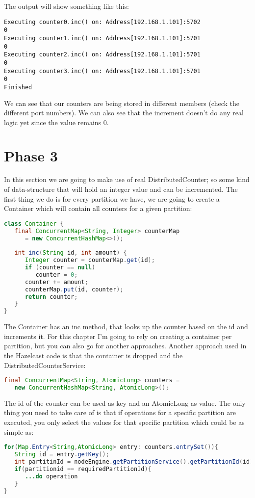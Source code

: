 The output will show something like this:
\begin{lstlisting}
Executing counter0.inc() on: Address[192.168.1.101]:5702
0
Executing counter1.inc() on: Address[192.168.1.101]:5701
0
Executing counter2.inc() on: Address[192.168.1.101]:5701
0
Executing counter3.inc() on: Address[192.168.1.101]:5701
0
Finished
\end{lstlisting}
We can see that our counters are being stored in different members (check the different port numbers). We can also see that the increment doesn't do any real logic yet since the value remains 0.

\section{Phase 3}
In this section we are going to make use of real DistributedCounter; so some kind of data-structure that will hold an integer value and can be incremented. The first thing we do is for every partition we have, we are going to create a Container which will contain all counters for a given partition:
\begin{lstlisting}[language=java]
class Container {
   final ConcurrentMap<String, Integer> counterMap 
      = new ConcurrentHashMap<>();
   
   int inc(String id, int amount) {
      Integer counter = counterMap.get(id);
      if (counter == null) 
         counter = 0;
      counter += amount;
      counterMap.put(id, counter);
      return counter;
   }
}
\end{lstlisting}
The Container has an inc method, that looks up the counter based on the id and increments it. For this chapter I'm going to rely on creating a container per partition, but you can also go for another approaches. Another approach used in the Hazelcast code is that the container is dropped and the DistributedCounterService:
\begin{lstlisting}[language=java]
final ConcurrentMap<String, AtomicLong> counters = 
   new ConcurrentHashMap<String, AtomicLong>();
\end{lstlisting}
The id of the counter can be used as key and an AtomicLong as value. The only thing you need to take care of is that if operations for a specific partition are executed, you only select the values for that specific partition which could be as simple as: 
\begin{lstlisting}[language=java]
for(Map.Entry<String,AtomicLong> entry: counters.entrySet()){
   String id = entry.getKey();
   int partitinId = nodeEngine.getPartitionService().getPartitionId(id); 
   if(partitionid == requiredPartitionId){
      ...do operation	
   }
}
\end{lstlisting}

